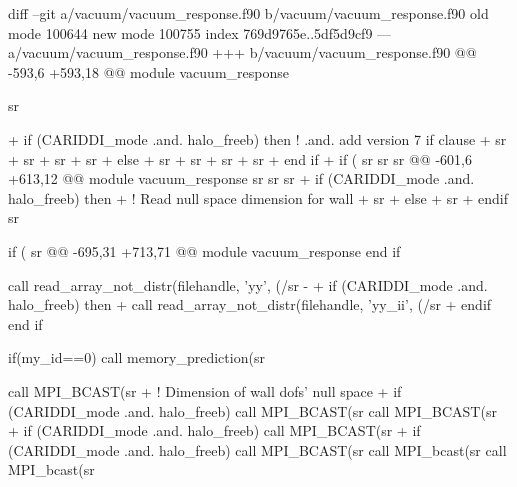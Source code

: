 diff --git a/vacuum/vacuum_response.f90 b/vacuum/vacuum_response.f90
old mode 100644
new mode 100755
index 769d9765e..5df5d9cf9
--- a/vacuum/vacuum_response.f90
+++ b/vacuum/vacuum_response.f90
@@ -593,6 +593,18 @@ module vacuum_response
       
       sr%
 
+      if (CARIDDI_mode .and. halo_freeb) then ! .and. add version 7 if clause
+        sr%
+        sr%
+        sr%
+        sr%
+      else 
+        sr%
+        sr%
+        sr%
+        sr%
+      end if
+
       if ( sr%
         sr%
         sr%
@@ -601,6 +613,12 @@ module vacuum_response
       sr%
       sr%
       sr%
+      if (CARIDDI_mode .and. halo_freeb) then
+        ! Read null space dimension for wall
+        sr%
+      else
+        sr%
+      endif
       sr%
 
       if ( sr%
@@ -695,31 +713,71 @@ module vacuum_response
       end if
 
       call read_array_not_distr(filehandle, 'yy', (/sr%
-   
+      if (CARIDDI_mode .and. halo_freeb) then
+        call read_array_not_distr(filehandle, 'yy_ii', (/sr%
+      endif
     end if
 
     if(my_id==0) call memory_prediction(sr%
 
     call MPI_BCAST(sr%
+    ! Dimension of wall dofs' null space
+    if (CARIDDI_mode .and. halo_freeb) call MPI_BCAST(sr%
     call MPI_BCAST(sr%
+    if (CARIDDI_mode .and. halo_freeb) call MPI_BCAST(sr%
+    if (CARIDDI_mode .and. halo_freeb) call MPI_BCAST(sr%
     call MPI_bcast(sr%
     call MPI_bcast(sr%
 
